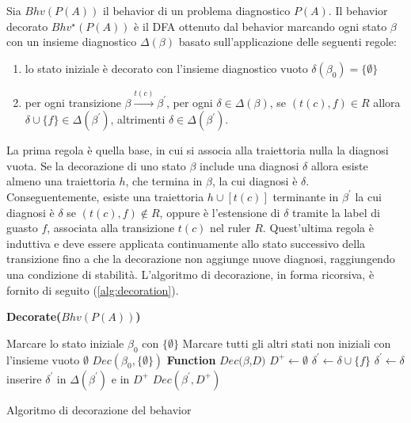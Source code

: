 \begin{defn}
Sia $Bhv(P(A))$ il behavior di un problema diagnostico $P(A)$. Il behavior decorato $Bhv^\star(P(A))$ è il DFA ottenuto dal behavior marcando ogni stato $\beta$ con un insieme diagnostico $\Delta(\beta)$ basato sull'applicazione delle seguenti regole:
\begin{enumerate}
\item lo stato iniziale è decorato con l'insieme diagnostico vuoto $\delta(\beta_0) = \{\emptyset\}$
\item per ogni transizione $\beta \xrightarrow{t(c)} \beta^\prime$, per ogni $\delta \in \Delta(\beta)$, se $(t(c),f) \in R$ allora $\delta \cup \{f\} \in \Delta(\beta^\prime)$, altrimenti $\delta \in \Delta(\beta^\prime)$.
\end{enumerate}
\end{defn}
La prima regola è quella base, in cui si associa alla traiettoria nulla la diagnosi vuota.
Se la decorazione di uno stato $\beta$ include una diagnosi $\delta$ allora esiste almeno una traiettoria $h$, che termina in $\beta$, la cui diagnosi è $\delta$. Conseguentemente, esiste una traiettoria $h \cup [t(c)]$ terminante in $\beta^\prime$ la cui diagnosi è $\delta$ se $(t(c),f) \notin R$, oppure è l'estensione di $\delta$ tramite la label di guasto $f$, associata alla transizione $t(c)$ nel ruler $R$. 
Quest'ultima regola è induttiva e deve essere applicata continuamente allo stato successivo della transizione fino a che la decorazione non aggiunge nuove diagnosi, raggiungendo una condizione di stabilità.
L'algoritmo di decorazione, in forma ricorsiva, è fornito di seguito (\ref{alg:decoration}).

\begin{algorithm}
\textbf{Decorate($Bhv(P(A))$)}
\begin{algorithmic}
\STATE Marcare lo stato iniziale $\beta_0$ con $\{\emptyset\}$ 
\STATE Marcare tutti gli altri stati non iniziali con l'insieme vuoto $\emptyset$
\STATE $Dec(\beta_0,\{\emptyset\})$
\STATE
\STATE \textbf{Function} $Dec(\beta$,$D)$
		\STATE $D^+ \leftarrow \emptyset$
				\STATE $\delta^\prime \leftarrow \delta \cup \{f\}$
			\ELSE
				\STATE $\delta^\prime \leftarrow \delta$
			\ENDIF
			\IF{$\delta^\prime \notin \Delta(\beta^\prime)$}
				\STATE inserire $\delta^\prime$ in $\Delta(\beta^\prime)$ e in $D^+$
			\ENDIF
		\ENDFOR
			\STATE $Dec(\beta^\prime, D^+)$
		\ENDIF
	\ENDFOR
\end{algorithmic}
\caption{Algoritmo di decorazione del behavior}
\label{alg:decoration}
\end{algorithm}

